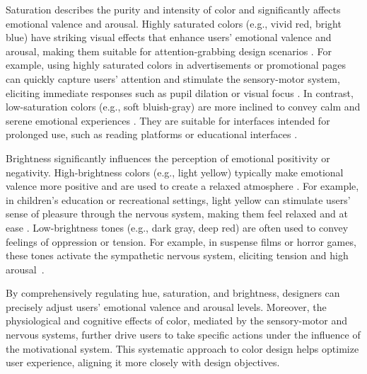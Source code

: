 Saturation describes the purity and intensity of color and significantly affects emotional valence and arousal. Highly saturated colors (e.g., vivid red, bright blue) have striking visual effects that enhance users’ emotional valence and arousal, making them suitable for attention-grabbing design scenarios \cite{lin2023effect}. For example, using highly saturated colors in advertisements or promotional pages can quickly capture users’ attention and stimulate the sensory-motor system, eliciting immediate responses such as pupil dilation or visual focus \cite{zajonc1980feeling}. In contrast, low-saturation colors (e.g., soft bluish-gray) are more inclined to convey calm and serene emotional experiences \cite{pazda2024colorfulness}. They are suitable for interfaces intended for prolonged use, such as reading platforms or educational interfaces \cite{wang2013interpretable}.

Brightness significantly influences the perception of emotional positivity or negativity. High-brightness colors (e.g., light yellow) typically make emotional valence more positive and are used to create a relaxed atmosphere \cite{jonauskaite2019color}. For example, in children’s education or recreational settings, light yellow can stimulate users’ sense of pleasure through the nervous system, making them feel relaxed and at ease \cite{ledoux2000emotion}. Low-brightness tones (e.g., dark gray, deep red) are often used to convey feelings of oppression or tension. For example, in suspense films or horror games, these tones activate the sympathetic nervous system, eliciting tension and high arousal~\cite{weijs2023effects}.

By comprehensively regulating hue, saturation, and brightness, designers can precisely adjust users’ emotional valence and arousal levels. Moreover, the physiological and cognitive effects of color, mediated by the sensory-motor and nervous systems, further drive users to take specific actions under the influence of the motivational system. This systematic approach to color design helps optimize user experience, aligning it more closely with design objectives.


